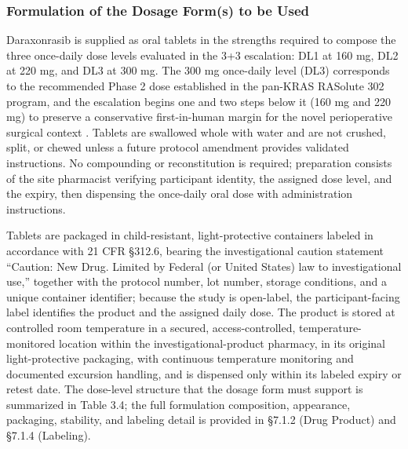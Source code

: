 \subsubsection{Formulation of the Dosage Form(s) to be Used}

Daraxonrasib is supplied as oral tablets in the strengths required to compose the
three once-daily dose levels evaluated in the 3+3 escalation: DL1 at 160 mg, DL2 at
220 mg, and DL3 at 300 mg. The 300 mg once-daily level (DL3) corresponds to the
recommended Phase 2 dose established in the pan-KRAS RASolute 302 program, and the
escalation begins one and two steps below it (160 mg and 220 mg) to preserve a
conservative first-in-human margin for the novel perioperative surgical context
\cite{daraxwhipple, onpremwhippl}. Tablets are swallowed whole with water and are
not crushed, split, or chewed unless a future protocol amendment provides validated
instructions. No compounding or reconstitution is required; preparation consists of
the site pharmacist verifying participant identity, the assigned dose level, and the
expiry, then dispensing the once-daily oral dose with administration instructions.

Tablets are packaged in child-resistant, light-protective containers labeled in
accordance with 21 CFR \S 312.6, bearing the investigational caution statement
``Caution: New Drug. Limited by Federal (or United States) law to investigational
use,'' together with the protocol number, lot number, storage conditions, and a
unique container identifier; because the study is open-label, the participant-facing
label identifies the product and the assigned daily dose. The product is stored at
controlled room temperature in a secured, access-controlled, temperature-monitored
location within the investigational-product pharmacy, in its original
light-protective packaging, with continuous temperature monitoring and documented
excursion handling, and is dispensed only within its labeled expiry or retest date.
The dose-level structure that the dosage form must support is summarized in Table
3.4; the full formulation composition, appearance, packaging, stability, and labeling
detail is provided in \S 7.1.2 (Drug Product) and \S 7.1.4 (Labeling).



